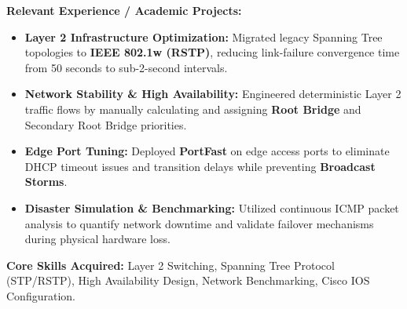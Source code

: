 \documentclass[11pt]{article}
\begin{document}
\vspace{0.5em}
\noindent \textbf{Relevant Experience / Academic Projects:}
\begin{itemize}[leftmargin=*, itemsep=2pt]
    \item \textbf{Layer 2 Infrastructure Optimization:} Migrated legacy Spanning Tree topologies to \textbf{IEEE 802.1w (RSTP)}, reducing link-failure convergence time from 50 seconds to sub-2-second intervals.
    \item \textbf{Network Stability \& High Availability:} Engineered deterministic Layer 2 traffic flows by manually calculating and assigning \textbf{Root Bridge} and Secondary Root Bridge priorities.
    \item \textbf{Edge Port Tuning:} Deployed \textbf{PortFast} on edge access ports to eliminate DHCP timeout issues and transition delays while preventing \textbf{Broadcast Storms}.
    \item \textbf{Disaster Simulation \& Benchmarking:} Utilized continuous ICMP packet analysis to quantify network downtime and validate failover mechanisms during physical hardware loss.
\end{itemize}

\vspace{1em}
\noindent \textbf{Core Skills Acquired:} Layer 2 Switching, Spanning Tree Protocol (STP/RSTP), High Availability Design, Network Benchmarking, Cisco IOS Configuration.
\end{document}
